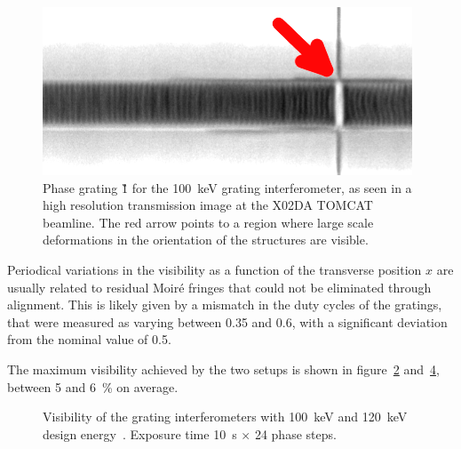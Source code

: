 \begin{figure}[htb]
    \centering
    \includegraphics[width=\textwidth]{gfx/mythen-edge-on/tomcat-grating.png}
    \caption{Phase grating \G1 for the \SI{100}{\kilo\eV} grating
interferometer, as seen in a high resolution transmission image at the X02DA
TOMCAT beamline. The red arrow points to a region where large scale
deformations in the orientation of the structures are visible.}
    \label{fig:defects-tomcat}
\end{figure}

Periodical variations in the visibility as a function of the transverse
position $x$ are usually related to residual Moir\'e fringes that could not
be eliminated through alignment. This is likely given by a mismatch in the
duty cycles of the gratings, that were measured as varying between 
\num{0.35} and \num{0.6}, with a significant deviation from the nominal value
of \num{0.5}.

The maximum visibility achieved by the two setups is shown in 
figure~\ref{fig:visibility100} and~\ref{fig:visibility120}, between \num{5} and
\SI{6}{\percent} on average.

\begin{figure}[h!]
    \centering
    \begin{subfigure}[b]{.75\textwidth}
        \resizebox{\textwidth}{!}{}
        \caption{}
        \label{fig:visibility100}
    \end{subfigure}
    \begin{subfigure}[b]{.75\textwidth}
        \resizebox{\textwidth}{!}{}
        \caption{}
        \label{fig:visibility120}
    \end{subfigure}
    \caption{Visibility of the grating
        interferometers with
        \SI{100}{\kilo\eV} and \SI{120}{\kilo\eV} design
        energy~\parencite{galitesina}. Exposure time \SI{10}{\second}
        $\times$ \num{24} phase steps.}
\end{figure}


